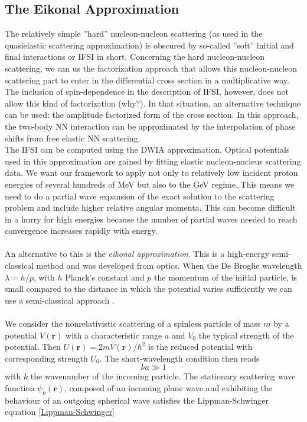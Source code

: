 \documentclass[11pt]{article}
\numberwithin{equation}{section}
\begin{document}
\subsection{The Eikonal Approximation}
The relatively simple ''hard'' nucleon-nucleon scattering (as used in the quasielastic scattering approximation) is obscured by so-called ''soft''  initial and final interactions or IFSI in short. Concerning the hard nucleon-nucleon scattering, we can us the factorization approach that allows this nucleon-nucleon scattering part to enter in the differential cross section in a multiplicative way. The inclusion of spin-dependence in the description of IFSI, however, does not allow this kind of factorization (why?). In that situation, an alternative technique can be used: the amplitude factorized form of the cross section. In this approach, the two-body NN interaction can be approximated by the interpolation of phase shifts from free elastic NN scattering.\\
The IFSI can be computed using the DWIA approximation. Optical potentials used in this approximation are gained by fitting elastic nucleon-nucleus scattering data. We want our framework to apply not only to relatively low incident proton energies of several hundreds of MeV but also to the GeV regime. This means we need to do a partial wave expansion of the exact solution to the scattering problem and include higher relative angular momenta. This can become difficult in a hurry for high energies because the number of partial waves needed to reach convergence increases rapidly with energy.
\\\\
An alternative to this is the \emph{eikonal approximation}. This is a high-energy semi-classical method and was developed from optics. When the De Broglie wavelength $\lambda = h/p$, with $h$ Planck's constant and $p$ the momentum of the initial particle, is small compared to the distance in which the potential varies sufficiently we can use a semi-classical approach \cite{Joachain75}.\\ 
\\
We consider the nonrelativistic scattering of a spinless particle of mass $m$ by a potential $V(\mathbf{r})$ with a characteristic range $a$ and $V_0$ the typical strength of the potential. Then $U(\mathbf{r}) = 2mV(\mathbf{r})/\hbar^2$ is the reduced potential with corresponding strength $U_0$. The short-wavelength condition then reads
\begin{equation}
	ka \gg 1 
\end{equation}
with $k$ the wavenumber of the incoming particle.
 The stationary scattering wave function $\psi_k(\mathbf{r})$, composed of an incoming plane wave and exhibiting the behaviour of an outgoing spherical wave satisfies the Lippman-Schwinger equation \eqref{Lippman-Schwinger}
\end{document}
